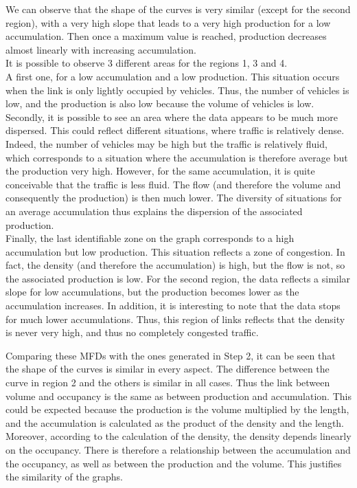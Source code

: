 \documentclass[a4paper, 12pt,oneside]{article}
\begin{document}
We can observe that the shape of the curves is very similar (except for the second region), with a very high slope that leads to a very high production for a low accumulation. Then once a maximum value is reached, production decreases almost linearly with increasing accumulation.\\
It is possible to observe 3 different areas for the regions 1, 3 and 4.\\
A first one, for a low accumulation and a low production. This situation occurs when the link is only lightly occupied by vehicles. Thus, the number of vehicles is low, and the production is also low because the volume of vehicles is low.\\
Secondly, it is possible to see an area where the data appears to be much more dispersed. This could reflect different situations, where traffic is relatively dense. Indeed, the number of vehicles may be high but the traffic is relatively fluid, which corresponds to a situation where the accumulation is therefore average but the production very high. However, for the same accumulation, it is quite conceivable that the traffic is less fluid. The flow (and therefore the volume and consequently the production) is then much lower. The diversity of situations for an average accumulation thus explains the dispersion of the associated production.\\
Finally, the last identifiable zone on the graph corresponds to a high accumulation but low production. This situation reflects a zone of congestion. In fact, the density (and therefore the accumulation) is high, but the flow is not, so the associated production is low.
For the second region, the data reflects a similar slope for low accumulations, but the production becomes lower as the accumulation increases. In addition, it is interesting to note that the data stops for much lower accumulations. Thus, this region of links reflects that the density is never very high, and thus no completely congested traffic.

\smallbreak

Comparing these MFDs with the ones generated in Step 2, it can be seen that the shape of the curves is similar in every aspect. The difference between the curve in region 2 and the others is similar in all cases. Thus the link between volume and occupancy is the same as between production and accumulation. This could be expected because the production is the volume multiplied by the length, and the accumulation is calculated as the product of the density and the length. Moreover, according to the calculation of the density, the density depends linearly on the occupancy. There is therefore a relationship between the accumulation and the occupancy, as well as between the production and the volume. This justifies the similarity of the graphs.\\
\end{document}
